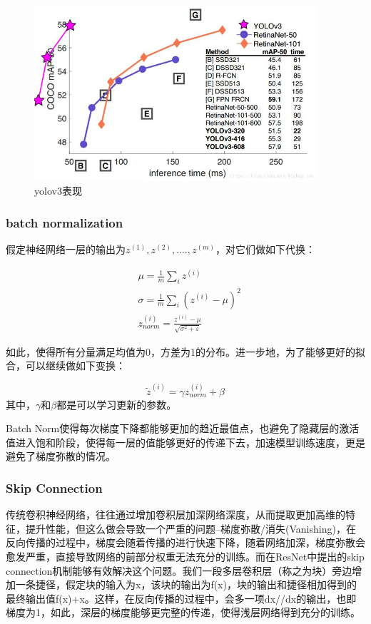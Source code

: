 \documentclass[12pt,a4paper,titlepage]{article}
\begin{document}
\begin{figure}[h]
\centering
\includegraphics[height=6.5cm]{img/yolov3.jpg}
\caption{yolov3表现}
\label{fig:yoloPerform}
\end{figure}

\subsubsection{batch normalization}
假定神经网络一层的输出为$z^{(1)}, z^{(2)}, .... , z^{(m)}$，对它们做如下代换：

\begin{align}
 &\mu = \frac{1}{m}\sum_iz^{(i)} \\
 &\sigma = \frac{1}{m}\sum_i(z^{(i)}-\mu)^2 \\
 &z^{(i)}_{norm} = \frac{z^{(i)}-\mu}{\sqrt{\sigma^2+\varepsilon}}
\end{align}

如此，使得所有分量满足均值为0，方差为1的分布。进一步地，为了能够更好的拟合，可以继续做如下变换：

\begin{equation}
\widetilde{z}^{(i)} = \gamma z_{norm}^{(i)}+\beta
\end{equation}
其中，$\gamma$和$\beta$都是可以学习更新的参数。\par
Batch Norm使得每次梯度下降都能够更加的趋近最值点，也避免了隐藏层的激活值进入饱和阶段，使得每一层的值能够更好的传递下去，加速模型训练速度，更是避免了梯度弥散的情况。

\subsubsection{Skip Connection}
传统卷积神经网络，往往通过增加卷积层加深网络深度，从而提取更加高维的特征，提升性能，但这么做会导致一个严重的问题--梯度弥散/消失(Vanishing)，在反向传播的过程中，梯度会随着传播的进行快速下降，随着网络加深，梯度弥散会愈发严重，直接导致网络的前部分权重无法充分的训练。而在ResNet中提出的skip connection机制能够有效解决这个问题。我们一段多层卷积层（称之为块）旁边增加一条捷径，假定块的输入为x，该块的输出为f(x)，块的输出和捷径相加得到的最终输出值f(x)+x。这样，在反向传播的过程中，会多一项dx//dx的输出，也即梯度为1，如此，深层的梯度能够更完整的传递，使得浅层网络得到充分的训练。
\end{document}
